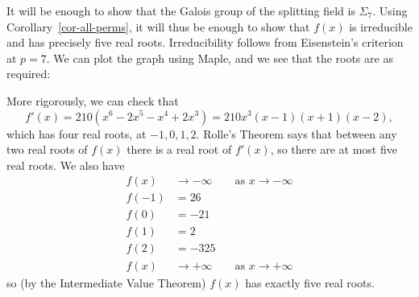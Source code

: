 \documentclass{amsart}
\newcommand{\Sg}        {\Sigma}
\renewcommand{\:}{\colon}
\newenvironment{solution}{\SolutionInline}{\endSolutionInline}
\theoremstyle{definition}
\renewenvironment{solution}{\SolutionAtEnd}{\endSolutionAtEnd}
\begin{document}
\begin{solution}
 It will be enough to show that the Galois group of the splitting
 field is $\Sg_7$.  Using Corollary~\ref{cor-all-perms}, it will thus
 be enough to show that $f(x)$ is irreducible and has precisely five
 real roots.  Irreducibility follows from Eisenstein's criterion at
 $p=7$.  We can plot the graph using Maple, and we see that the roots
 are as required:
 \begin{center}
 \end{center}
 More rigorously, we can check that
 \[ f'(x) = 210(x^6-2x^5-x^4+2x^3) = 210x^3(x-1)(x+1)(x-2), \]
 which has four real roots, at $-1,0,1,2$.  Rolle's Theorem says that
 between any two real roots of $f(x)$ there is a real root of
 $f'(x)$, so there are at most five real roots.  We also have   
 \begin{align*}
   f(x)  &\to -\infty\qquad\mbox{as }x\to-\infty\\
   f(-1) &= 26    \\
   f(0)  &= -21   \\
   f(1)  &= 2     \\
   f(2)  &= -325  \\
   f(x)  &\to +\infty\qquad\mbox{as }x\to+\infty
 \end{align*}
  so (by the Intermediate Value Theorem) $f(x)$ has exactly five real
  roots. 
\end{solution}
\end{document}
